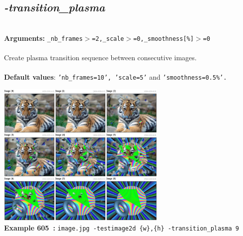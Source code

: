 \documentclass[a4paper,11pt,twoside]{book}
\begin{document}
\subsection{\emph{-transition\_plasma} }\vspace*{-0.5em}
~\\\textbf{Arguments: } 
{\small \texttt{\_nb\_frames$>$=2,\_scale$>$=0,\_smoothness[\%]$>$=0}}\\~\\
Create plasma transition sequence between consecutive images.
~\\~\\\textbf{Default values}: {\small \texttt{'nb\_frames=10', 'scale=5'} and \texttt{'smoothness=0.5\%'.}}
\begin{center}\includegraphics[keepaspectratio=true,height=7cm,width=\textwidth]{img/gmic_def605.jpg}\\
{\footnotesize \textbf{Example 605~:} \texttt{image.jpg -testimage2d \{w\},\{h\} -transition\_plasma 9}}
\end{center}
\end{document}
